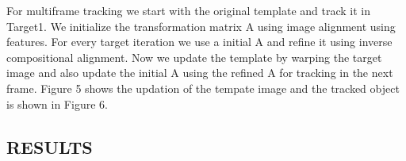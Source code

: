 \documentclass[letter, 10pt]{article}
\begin{document}

For multiframe tracking we start with the original template and track it in Target1. We initialize the transformation matrix A using image alignment using features. For every target iteration we use a initial A and refine it using inverse compositional alignment. Now we update the template by warping the target image and also update the initial A using the refined A for tracking in the next frame. Figure 5 shows the updation of the tempate image and the tracked object is shown in Figure 6. 

\subsection*{RESULTS}
\end{document}
